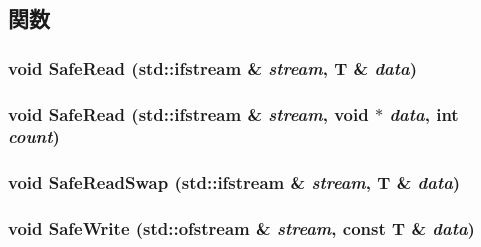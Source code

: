 \subsection{関数}
\hypertarget{disk__image_8hh_a1feac840a0ac7b5b5ae0fc32262033f3}{
\subsubsection[{SafeRead}]{\setlength{\rightskip}{0pt plus 5cm}void SafeRead (std::ifstream \& {\em stream}, \/  T \& {\em data})}}
\label{disk__image_8hh_a1feac840a0ac7b5b5ae0fc32262033f3}
\hypertarget{disk__image_8hh_aecc27cfca6f4c839b8b7b2e7c23ee16d}{
\subsubsection[{SafeRead}]{\setlength{\rightskip}{0pt plus 5cm}void SafeRead (std::ifstream \& {\em stream}, \/  void $\ast$ {\em data}, \/  int {\em count})}}
\label{disk__image_8hh_aecc27cfca6f4c839b8b7b2e7c23ee16d}
\hypertarget{disk__image_8hh_a6fcf5e92faf89d4d81045525f0cdb505}{
\subsubsection[{SafeReadSwap}]{\setlength{\rightskip}{0pt plus 5cm}void SafeReadSwap (std::ifstream \& {\em stream}, \/  T \& {\em data})}}
\label{disk__image_8hh_a6fcf5e92faf89d4d81045525f0cdb505}
\hypertarget{disk__image_8hh_ae71db8488b0a70f2e3b31ee29f45caf8}{
\subsubsection[{SafeWrite}]{\setlength{\rightskip}{0pt plus 5cm}void SafeWrite (std::ofstream \& {\em stream}, \/  const T \& {\em data})}}
